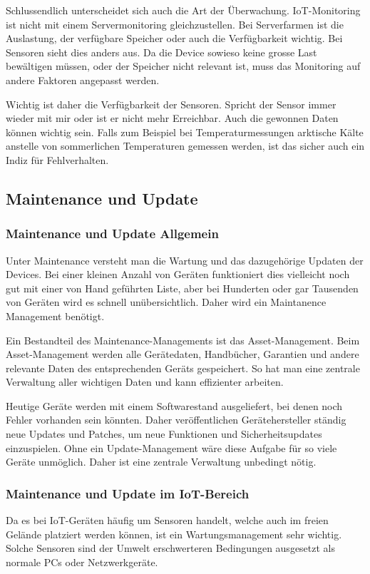 Schlussendlich unterscheidet sich auch die Art der Überwachung. IoT-Monitoring ist nicht mit einem Servermonitoring gleichzustellen. Bei Serverfarmen ist die Auslastung, der verfügbare Speicher oder auch die Verfügbarkeit wichtig. Bei Sensoren sieht dies anders aus. Da die Device sowieso keine grosse Last bewältigen müssen, oder der Speicher nicht relevant ist, muss das Monitoring auf andere Faktoren angepasst werden. 

Wichtig ist daher die Verfügbarkeit der Sensoren. Spricht der Sensor immer wieder mit mir oder ist er nicht mehr Erreichbar. Auch die gewonnen Daten können wichtig sein. Falls zum Beispiel bei Temperaturmessungen arktische Kälte anstelle von sommerlichen Temperaturen gemessen werden, ist das sicher auch ein Indiz für Fehlverhalten.\cite{MonTypes}

\subsection{Maintenance und Update}
\subsubsection{Maintenance und Update Allgemein}
Unter Maintenance versteht man die Wartung und das dazugehörige Updaten der Devices. Bei einer kleinen Anzahl von Geräten funktioniert dies vielleicht noch gut mit einer von Hand geführten Liste, aber bei Hunderten oder gar Tausenden von Geräten wird es schnell unübersichtlich. Daher wird ein Maintanence Management benötigt.

Ein Bestandteil des Maintenance-Managements ist das Asset-Management. Beim Asset-Management werden alle Gerätedaten, Handbücher, Garantien und andere relevante Daten des entsprechenden Geräts gespeichert.\cite{MainAsset} So hat man eine zentrale Verwaltung aller wichtigen Daten und kann effizienter arbeiten.

Heutige Geräte werden mit einem Softwarestand ausgeliefert, bei denen noch Fehler vorhanden sein könnten. Daher veröffentlichen Gerätehersteller ständig neue Updates und Patches, um neue Funktionen und Sicherheitsupdates einzuspielen. Ohne ein Update-Management wäre diese Aufgabe für so viele Geräte unmöglich. Daher ist eine zentrale Verwaltung unbedingt nötig. 
\subsubsection{Maintenance und Update im IoT-Bereich}
Da es bei IoT-Geräten häufig um Sensoren handelt, welche auch im freien Gelände platziert werden können, ist ein Wartungsmanagement sehr wichtig. Solche Sensoren sind der Umwelt erschwerteren Bedingungen ausgesetzt als normale PCs oder Netzwerkgeräte.

